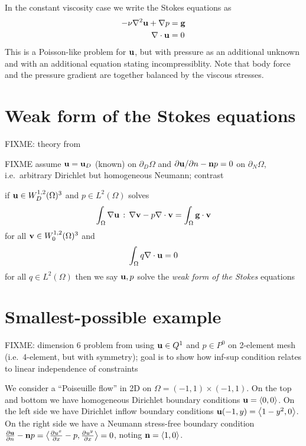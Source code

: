 In the constant viscosity case we write the Stokes equations as
\begin{align}
- \nu \nabla^2 \mathbf{u} + \nabla p &= \mathbf{g} \\
\nabla\cdot \mathbf{u} &= 0
\end{align}
This is a Poisson-like problem for $\mathbf{u}$, but with pressure as an additional unknown and with an additional equation stating incompressiblity.  Note that body force and the pressure gradient are together balanced by the viscous stresses.


\section{Weak form of the Stokes equations}

FIXME: theory from \citep{Braess2007,Elmanetal2005}

FIXME assume $\mathbf{u}=\mathbf{u}_D$ (known) on $\partial_D\Omega$ and $\partial \mathbf{u}/\partial n - \mathbf{n} p = 0$ on $\partial_N\Omega$, i.e.~arbitrary Dirichlet but homogeneous Neumann; contrast \citep{Elmanetal2005}

if $\mathbf{u} \in W_D^{1,2}(\Omega)^3$ and $p \in L^2(\Omega)$ solves
\begin{equation}
\int_\Omega \nabla \mathbf{u} \,:\, \nabla \mathbf{v} - p \nabla\cdot \mathbf{v} = \int_\Omega \mathbf{g} \cdot \mathbf{v} \label{eq:ok:weakstokesvelocity}
\end{equation}
for all $\mathbf{v} \in W_0^{1,2}(\Omega)^3$ and
\begin{equation}
\int_\Omega q \nabla\cdot \mathbf{u} = 0 \label{eq:ok:weakstokespressure}
\end{equation}
for all $q \in L^2(\Omega)$ then we say $\mathbf{u},p$ solve the \emph{weak form of the Stokes} equations


\section{Smallest-possible example}

FIXME: dimension 6 problem from using $\mathbf{u}\in Q^1$ and $p\in P^0$ on 2-element mesh (i.e.~4-element, but with symmetry); goal is to show how inf-sup condition relates to linear independence of constraints

We consider a ``Poiseuille flow'' \citep{Elmanetal2005} in 2D on $\Omega=(-1,1)\times(-1,1)$.  On the top and bottom we have homogeneous Dirichlet boundary conditions $\mathbf{u}=\left<0,0\right>$.  On the left side we have Dirichlet inflow boundary conditions $\mathbf{u}(-1,y) = \left<1-y^2,0\right>$.  On the right side we have a Neumann stress-free boundary condition $\frac{\partial \mathbf{u}}{\partial n} - \mathbf{n} p = \left<\frac{\partial u^x}{\partial x}-p,\frac{\partial u^y}{\partial x}\right> = 0$, noting $\mathbf{n} = \left<1,0\right>$.

